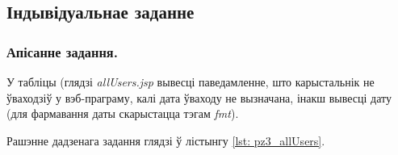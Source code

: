\subsection{Індывідуальнае заданне}

\subsubsection{Апісанне задання.}

У табліцы (глядзі \textit{allUsers.jsp} вывесці паведамленне, што
карыстальнік не ўваходзіў у вэб-праграму, калі дата ўваходу не вызначана,
інакш вывесці дату (для фармавання даты скарыстацца тэгам \textit{fmt}).

Рашэнне дадзенага задання глядзі ў лістынгу \ref{lst: pz3_allUsers}.

